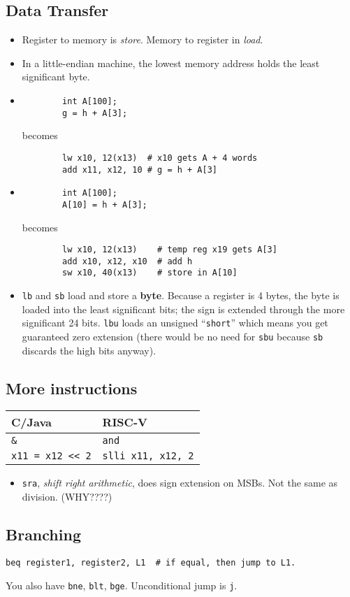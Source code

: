 \subsection{Data Transfer}
\begin{itemize}
	\item Register to memory is \emph{store}. Memory to register in \emph{load}.
	\item In a little-endian machine, the lowest memory address holds the least significant byte.
	\item 
		\begin{verbatim}
		int A[100];
		g = h + A[3];
		\end{verbatim}
		becomes
		\begin{verbatim}
		lw x10, 12(x13)  # x10 gets A + 4 words
		add x11, x12, 10 # g = h + A[3]
		\end{verbatim}
	\item 
		\begin{verbatim}
		int A[100];
		A[10] = h + A[3];
		\end{verbatim}
		becomes
		\begin{verbatim}
		lw x10, 12(x13)    # temp reg x19 gets A[3]
		add x10, x12, x10  # add h
		sw x10, 40(x13)    # store in A[10]
		\end{verbatim}
	\item \texttt{lb} and \texttt{sb} load and store a \textbf{byte}. Because a register is 4 bytes, the byte is loaded into the least significant bits; the sign is extended through the more significant 24 bits. \texttt{lbu} loads an unsigned ``\texttt{short}'' which means you get guaranteed zero extension (there would be no need for \texttt{sbu} because \texttt{sb} discards the high bits anyway).
\end{itemize}

\subsection{More instructions}
\begin{tabular}{ll}
	C/Java & RISC-V \\\hline
	\verb|&| & \texttt{and} \\
	\texttt{x11 = x12 << 2} & \texttt{slli x11, x12, 2}
\end{tabular}
\begin{itemize}
	\item \texttt{sra}, \emph{shift right arithmetic}, does sign extension on MSBs. Not the same as division. (WHY????)
\end{itemize}

\subsection{Branching}
\begin{verbatim}
beq register1, register2, L1  # if equal, then jump to L1.
\end{verbatim}
You also have \texttt{bne}, \texttt{blt}, \texttt{bge}. Unconditional jump is \texttt{j}.